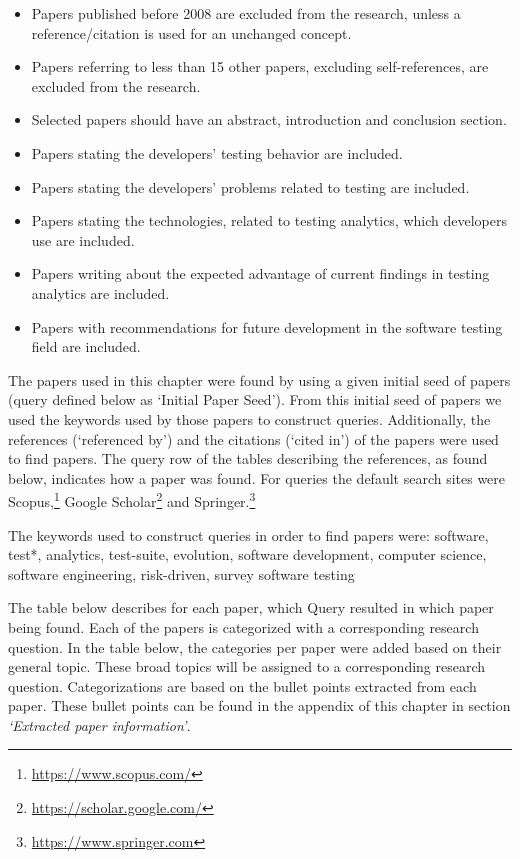 \documentclass[]{book}
\providecommand{\tightlist}{%
  \setlength{\itemsep}{0pt}\setlength{\parskip}{0pt}}
\let\rmarkdownfootnote\footnote%
\def\footnote{\protect\rmarkdownfootnote}
\begin{document}
\begin{itemize}
\tightlist
\item
  Papers published before 2008 are excluded from the research, unless a
  reference/citation is used for an unchanged concept.
\item
  Papers referring to less than 15 other papers, excluding
  self-references, are excluded from the research.
\item
  Selected papers should have an abstract, introduction and conclusion
  section.
\item
  Papers stating the developers' testing behavior are included.
\item
  Papers stating the developers' problems related to testing are
  included.
\item
  Papers stating the technologies, related to testing analytics, which
  developers use are included.
\item
  Papers writing about the expected advantage of current findings in
  testing analytics are included.
\item
  Papers with recommendations for future development in the software
  testing field are included.
\end{itemize}

The papers used in this chapter were found by using a given initial seed
of papers (query defined below as `Initial Paper Seed'). From this
initial seed of papers we used the keywords used by those papers to
construct queries. Additionally, the references (`referenced by') and
the citations (`cited in') of the papers were used to find papers. The
query row of the tables describing the references, as found below,
indicates how a paper was found. For queries the default search sites
were Scopus,\footnote{\url{https://www.scopus.com/}} Google
Scholar\footnote{\url{https://scholar.google.com/}} and
Springer.\footnote{\url{https://www.springer.com}}

The keywords used to construct queries in order to find papers were:
software, test*, analytics, test-suite, evolution, software development,
computer science, software engineering, risk-driven, survey software
testing

The table below describes for each paper, which Query resulted in which
paper being found. Each of the papers is categorized with a
corresponding research question. In the table below, the categories per
paper were added based on their general topic. These broad topics will
be assigned to a corresponding research question. Categorizations are
based on the bullet points extracted from each paper. These bullet
points can be found in the appendix of this chapter in section
\emph{`Extracted paper information'}.
\end{document}
